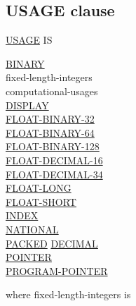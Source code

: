 \documentclass[a4paper,oneside,svgnames]{scrbook}
\makeatletter
\newcommand{\key}[1]{\underline{#1}}
\newcommand{\miscext}[1]{%
  \colorbox{blue!50}{#1}}
\newcommand{\pending}[1]{%
  \textcolor{gray!75}{#1}}
\newenvironment{0-1}{$\left[ \begin{tabular}{@{}l@{}}}{\end{tabular} \right]$}
\newenvironment{1=}{$\left\{ \begin{tabular}{@{}l@{}}}{\end{tabular} \right\}$}
\makeatother
\begin{document}
\subsection{USAGE clause}

\begin{0-1}
  \key{USAGE} IS
\end{0-1}
\begin{1=}
  \key{BINARY} \\

  fixed-length-integers \\
  computational-usages \\

  \key{DISPLAY} \\

  \pending{\key{FLOAT-BINARY-32}} \\
  \pending{\key{FLOAT-BINARY-64}} \\
  \pending{\key{FLOAT-BINARY-128}} \\
  \key{FLOAT-DECIMAL-16} \\
  \key{FLOAT-DECIMAL-34} \\
  \key{FLOAT-LONG} \\
  \key{FLOAT-SHORT} \\

  \key{INDEX} \\

  \pending{\key{NATIONAL}} \\

  \key{PACKED} \key{DECIMAL} \\
  \miscext{\key{POINTER}} \\
  \key{PROGRAM-POINTER} \\
\end{1=}

where fixed-length-integers is
\end{document}
